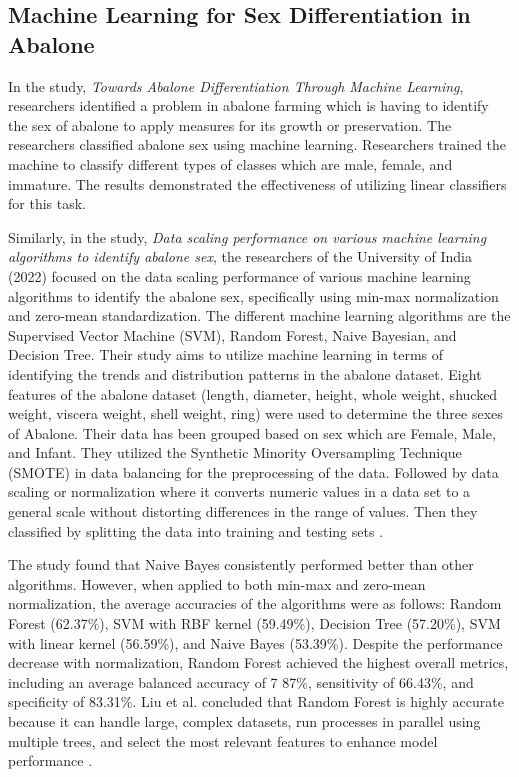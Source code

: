 {\subsection{Machine Learning for Sex Differentiation in Abalone}
In the study, \textit{Towards Abalone Differentiation Through Machine Learning}, researchers identified a problem in abalone farming which is having to identify the sex of abalone to apply measures for its growth or preservation. The researchers classified abalone sex using machine learning. Researchers trained the machine to classify different types of classes which are male, female, and immature. The results demonstrated the effectiveness of utilizing linear classifiers for this task.

Similarly, in the study, \textit{Data scaling performance on various machine learning algorithms to identify abalone sex}, the researchers of the University of India (2022) focused on the data scaling performance of various machine learning algorithms to identify the abalone sex, specifically using min-max normalization and zero-mean standardization. The different machine learning algorithms are the Supervised Vector Machine (SVM), Random Forest, Naive Bayesian, and Decision Tree. Their study aims to utilize machine learning in terms of identifying the trends and distribution patterns in the abalone dataset. Eight features of the abalone dataset (length, diameter, height, whole weight, shucked weight, viscera weight, shell weight, ring) were used to determine the three sexes of Abalone. Their data has been grouped based on sex which are Female, Male, and Infant. They utilized the Synthetic Minority Oversampling Technique (SMOTE) in data balancing for the preprocessing of the data. Followed by data scaling or normalization where it converts numeric values in a data set to a general scale without distorting differences in the range of values. Then they classified by splitting the data into training and testing sets \cite{arifin2021}. 

The study found that Naive Bayes consistently performed better than other algorithms. However, when applied to both min-max and zero-mean normalization, the average accuracies of the algorithms were as follows: Random Forest (62.37\%), SVM with RBF kernel (59.49\%), Decision Tree (57.20\%), SVM with linear kernel (56.59\%), and Naive Bayes (53.39\%). Despite the performance decrease with normalization, Random Forest achieved the highest overall metrics, including an average balanced accuracy of 7
87\%, sensitivity of 66.43\%, and specificity of 83.31\%. Liu et al. concluded that Random Forest is highly accurate because it can handle large, complex datasets, run processes in parallel using multiple trees, and select the most relevant features to enhance model performance \cite{arifin2021}. 

}

